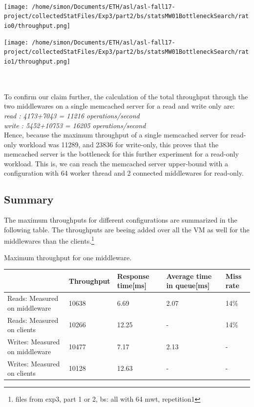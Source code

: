 \documentclass[11pt,a4paper]{article}
\begin{document}
\\
\begin{minipage}{0.5\linewidth}
\texttt{[image: /home/simon/Documents/ETH/asl/asl-fall17-project/collectedStatFiles/Exp3/part2/bs/statsMW01BottleneckSearch/ratio0/throughput.png]}
\end{minipage}
\hfill
\begin{minipage}{0.5\linewidth}
\texttt{[image: /home/simon/Documents/ETH/asl/asl-fall17-project/collectedStatFiles/Exp3/part2/bs/statsMW01BottleneckSearch/ratio1/throughput.png]}
\end{minipage}
\\\\
To confirm our claim further, the calculation of the total throughput through the two middlewares on a single memcached server for a read and write only are:
\\\textit{read : 4173+7043 = 11216 operations/second}
\\\textit{write : 5452+10753 = 16205 operations/second}
\\
Hence, because the maximum throughput of a single memcached server for read-only workload was 11289, and 23836 for write-only, this proves that the memcached server is the bottleneck for this further experiment for a read-only workload. This is, we can reach the memcached server upper-bound with a configuration with 64 worker thread and 2 connected middlewares for read-only. 



\subsection{Summary}
The maximum throughputs for different configurations are summarized in the following table. The throughputs are beeing added over all the VM as well for the middlewares than the clients.\footnote{files from exp3, part 1 or 2, bs: all with 64 mwt, repetition1} 

\begin{center}
	{Maximum throughput for one middleware.}
	\begin{tabular}{|l|p{2cm}|p{2cm}|p{2cm}|p{2cm}|}
		\hline                                & Throughput& Response time[ms] & Average time in queue[ms] & Miss rate \\ 
		\hline Reads: Measured on middleware  &10638           &6.69              &2.07                       &14\%           \\ 
		\hline Reads: Measured on clients     &10266            &12.25               &-                  &14\%           \\ 
		\hline Writes: Measured on middleware &10477            &7.17               &2.13                       &-      \\ 
		\hline Writes: Measured on clients    &10128            &12.63               &-                  &-       \\ 
		\hline 
	\end{tabular}
\end{center}
\end{document}

